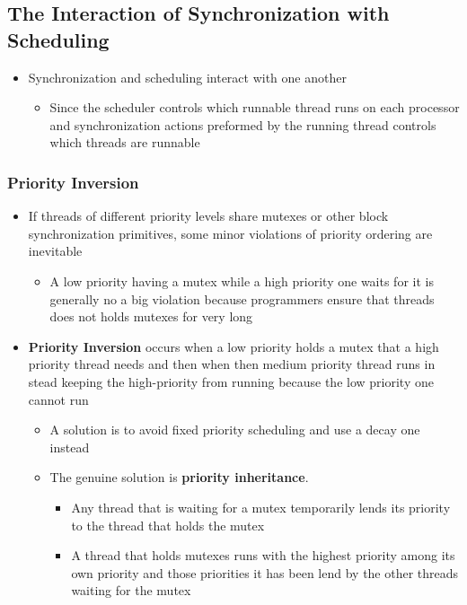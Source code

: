 \documentclass[11pt]{article}
\providecommand{\tightlist}{%
      \setlength{\itemsep}{0pt}\setlength{\parskip}{0pt}}
\begin{document}
    \subsection{The Interaction of Synchronization with
Scheduling}\label{the-interaction-of-synchronization-with-scheduling}

\begin{itemize}
\tightlist
\item
  Synchronization and scheduling interact with one another

  \begin{itemize}
  \tightlist
  \item
    Since the scheduler controls which runnable thread runs on each
    processor and synchronization actions preformed by the running
    thread controls which threads are runnable
  \end{itemize}
\end{itemize}

    \subsubsection{Priority Inversion}\label{priority-inversion}

\begin{itemize}
\tightlist
\item
  If threads of different priority levels share mutexes or other block
  synchronization primitives, some minor violations of priority ordering
  are inevitable

  \begin{itemize}
  \tightlist
  \item
    A low priority having a mutex while a high priority one waits for it
    is generally no a big violation because programmers ensure that
    threads does not holds mutexes for very long
  \end{itemize}
\item
  \textbf{Priority Inversion} occurs when a low priority holds a mutex
  that a high priority thread needs and then when then medium priority
  thread runs in stead keeping the high-priority from running because
  the low priority one cannot run

  \begin{itemize}
  \tightlist
  \item
    A solution is to avoid fixed priority scheduling and use a decay one
    instead
  \item
    The genuine solution is \textbf{priority inheritance}.

    \begin{itemize}
    \tightlist
    \item
      Any thread that is waiting for a mutex temporarily lends its
      priority to the thread that holds the mutex
    \item
      A thread that holds mutexes runs with the highest priority among
      its own priority and those priorities it has been lend by the
      other threads waiting for the mutex
    \end{itemize}
  \end{itemize}
\end{itemize}
\end{document}
